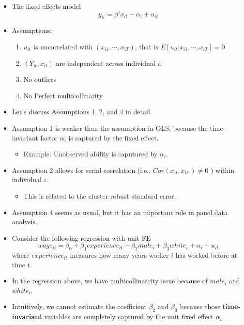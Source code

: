 \documentclass[]{book}
\providecommand{\tightlist}{%
  \setlength{\itemsep}{0pt}\setlength{\parskip}{0pt}}
\begin{document}
\begin{itemize}
\tightlist
\item
  The fixed effects model \[
  y_{it} = \beta' x_{it} + \alpha_i + u_{it}
  \]
\item
  Assumptions:

  \begin{enumerate}
  \def\labelenumi{\arabic{enumi}.}
  \tightlist
  \item
    \(u_{it}\) is uncorrelated with \((x_{i1},\cdots, x_{iT})\), that is
    \(E[u_{it}|x_{i1},\cdots, x_{iT} ] = 0\)
  \item
    \((Y_{it}, x_{it})\) are independent across individual \(i\).
  \item
    No outliers
  \item
    No Perfect multicollinarity
  \end{enumerate}
\item
  Let's discuss Assumptions 1, 2, and 4 in detail.
\item
  Assumption 1 is weaker than the assumption in OLS, because the
  time-invariant factor \(\alpha_i\) is captured by the fixed effect.

  \begin{itemize}
  \tightlist
  \item
    Example: Unobserved ability is caputured by \(\alpha_i\).
  \end{itemize}
\item
  Assumption 2 allows for serial correlation (i.e.,
  \(Cov(x_{it},x_{it'} ) \neq 0\) ) within individual \(i\).

  \begin{itemize}
  \tightlist
  \item
    This is related to the cluster-robust standard error.
  \end{itemize}
\item
  Assumption 4 seems as usual, but it has an important role in panel
  data analysis.
\item
  Consider the following regression with unit FE \[
  wage_{it} = \beta_0 + \beta_1 experience_{it} + \beta_2 male_{i} + \beta_3 white_{i} + \alpha_i + u_{it}
  \] where \(experience_{it}\) measures how many years worker \(i\) has
  worked before at time \(t\).
\item
  In the regression above, we have multicollinearity issue because of
  \(male_{i}\) and \(white_{i}\).
\item
  Intuitively, we cannot estimate the coefficient \(\beta_2\) and
  \(\beta_3\) because those \textbf{time-invariant} variables are
  completely captured by the unit fixed effect \(\alpha_i\).
\end{itemize}
\end{document}
